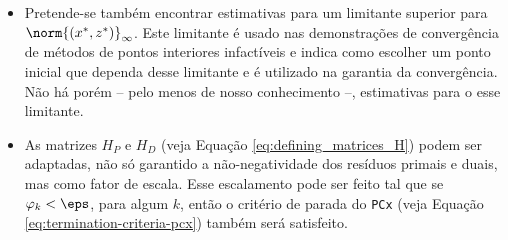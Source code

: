 \begin{itemize}
 
    
          \item Pretende-se também encontrar estimativas para um limitante superior
          para $\norm{(x^*,z^*)}_\infty$. Este limitante é usado nas
          demonstrações de convergência de métodos
      de pontos interiores infactíveis e indica como escolher um ponto inicial
      que dependa desse limitante e é utilizado na garantia da convergência. Não
      há porém -- pelo menos de nosso conhecimento --, estimativas para o esse
      limitante.


\item As matrizes $H_P$ e $H_D$ (veja Equação
\eqref{eq:defining_matrices_H}) podem ser adaptadas, não só garantido a
não-negatividade dos resíduos primais e duais, mas como fator de escala.
Esse escalamento pode ser feito tal que se
$\varphi_k<\eps$, para algum $k$, então o critério de parada do 
\texttt{PCx} (veja Equação \eqref{eq:termination-criteria-pcx}) também será
satisfeito.
\end{itemize}

